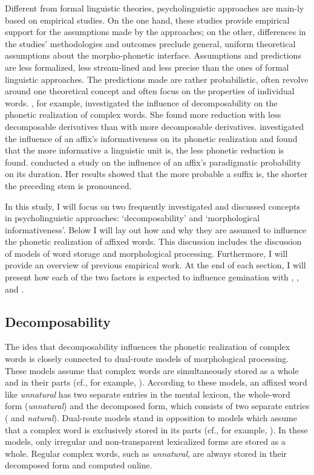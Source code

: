 Different from formal linguistic theories, psycholinguistic approaches are main-ly based on empirical studies. On the one hand, these studies provide empirical support for the assumptions made by the approaches; on the other, differences in the studies' methodologies and outcomes preclude general, uniform theoretical assumptions about the morpho-phonetic interface. Assumptions and predictions are less formalized, less stream-lined and less precise than the ones of formal linguistic approaches. The predictions made are rather probabilistic, often revolve around one theoretical concept and often focus on the properties of individual words. 
 \cite{Hay.2001,Hay.2003}, for example, investigated the influence of decomposability on the phonetic realization of complex words.  She found more reduction with less decomposable derivatives than with more decomposable derivatives. 
\cite{Pluymaekers.2010} investigated the influence of an affix's informativeness on its phonetic realization and found that the more informative a linguistic unit is, the less phonetic reduction is found. 
\cite{Cohen.2014} conducted a study on the influence of an affix's paradigmatic probability on its duration. Her results showed that the more probable a suffix is, the shorter the preceding stem is pronounced.

In this study, I will focus on two frequently investigated and discussed concepts in psycholinguistic approaches: `decomposability' and `morphological informativeness'. Below I will lay out how and why they are assumed to influence the phonetic realization of affixed words. This discussion includes the discussion of models of word storage and morphological processing. Furthermore, I will provide an overview of previous empirical work.
 At the end of each section, I will present how each of the two factors is expected to influence gemination with , ,  and .

\subsection{Decomposability} \label{decomposability}

The idea that decomposability influences the phonetic realization of complex words is closely connected to dual-route models of morphological processing. These models assume that complex words are simultaneously stored as a whole and in their parts (cf., for example, \citealt{Frauenfelder.1992,Schreuder.2015,deVaan.2011,Caselli.2016}). According to these models, an affixed word like \textit{unnatural} has two separate entries in the mental lexicon, the whole-word form (\textit{unnatural}) and the decomposed form, which consists of two separate entries ( and \textit{natural}). Dual-route models stand in opposition to models which assume that a complex word is exclusively stored in its parts (cf., for example, \citealt{Prasada.1993,Marcus.1995,Clahsen.1999,Pinker.2002}). In these models, only irregular and non-transparent lexicalized forms are stored as a whole. Regular complex words, such as \textit{unnatural}, are always stored in their decomposed form and computed online. 

